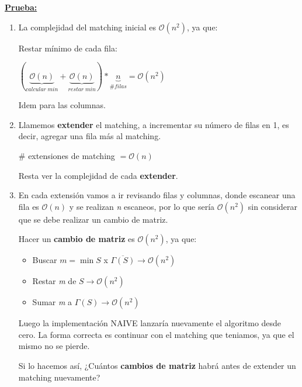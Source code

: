 \documentclass[12pt,a4paper]{report}
\begin{document}
		\textbf{\underline{Prueba:}}
			\begin{enumerate}
				\item La complejidad del matching inicial es $\mathcal{O}(n^{2})$, ya que:
					\par Restar mínimo de cada fila:
					\begin{center}
						$(\underbrace{\mathcal{O}(n)}_{calcular \; min} + \underbrace{\mathcal{O}(n)}_{restar \; min}) * \underbrace{n}_{\# filas} = \mathcal{O}(n^{2})$
					\end{center}
					\par Idem para las columnas.
				\item Llamemos \textbf{extender} el matching, a incrementar su número de filas en 1, es decir, agregar una fila más al matching.
					\begin{center}
						$\#$ extensiones de matching $= \mathcal{O}(n)$
					\end{center}

				\par Resta ver la complejidad de cada \textbf{extender}.
				\item En cada extensión vamos a ir revisando filas y columnas, donde escanear una fila es $\mathcal{O}(n)$ y se realizan \textit{n} escaneos, por lo que sería $\mathcal{O}(n^{2})$ sin considerar que se debe realizar un cambio de matriz.
					\par Hacer un \textbf{cambio de matriz} es $\mathcal{O}(n^{2})$, ya que:
					\begin{itemize}
						\item Buscar $\textit{m} = \min S$ x $\overline{\Gamma(S)} \rightarrow \mathcal{O}(n^{2})$
						\item Restar \textit{m} de $S \rightarrow \mathcal{O}(n^{2})$
						\item Sumar \textit{m} a $\Gamma(S) \rightarrow \mathcal{O}(n^{2})$
					\end{itemize}

					\par Luego la implementación NAIVE lanzaría nuevamente el algoritmo desde cero. La forma correcta es continuar con el matching que teniamos, ya que el mismo no se pierde.
					\par Si lo hacemos así, ¿Cuántos \textbf{cambios de matriz} habrá antes de extender un matching nuevamente?


\end{enumerate}
\end{document}
